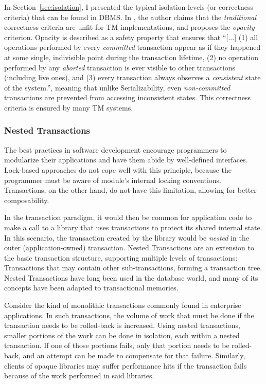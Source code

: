 \documentclass{llncs}
\begin{document}
In Section~\ref{sec:isolation}, I presented the typical isolation
levels (or correctness criteria) that can be found in DBMS. In
\cite{guerraoui2008correctness}, the author claims that the {\it
  traditional} correctness criteria are unfit for TM implementations,
and proposes the {\it opacity} criterion. Opacity is described as a
safety property that ensures that ``[...] (1) all operations performed
by every {\it committed} transaction appear as if they happened at
some single, indivisible point during the transaction lifetime, (2) no
operation performed by any {\it aborted} transaction is ever visible
to other transactions (including live ones), and (3) every transaction
always observes a {\it consistent} state of the system.'', meaning
that unlike Serializability, even {\it non-committed} transactions are
prevented from accessing inconsistent states. This correctness
criteria is ensured by many TM systems.

\subsubsection{Nested Transactions}

The best practices in software development encourage programmers to
modularize their applications and have them abide by well-defined
interfaces. Lock-based approaches do not cope well with this
principle, because the programmer must be aware of module's internal
locking conventions. Transactions, on the other hand, do not have this
limitation, allowing for better composability.

In the transaction paradigm, it would then be common for application
code to make a call to a library that uses transactions to protect its
shared internal state. In this scenario, the transaction created by
the library would be {\it nested} in the outer (application-owned)
transaction. Nested Transactions are an extension to the basic
transaction structure, supporting multiple levels of transactions:
Transactions that may contain other sub-transactions, forming a
transaction tree. Nested Transactions have long been used in the
database world, and many of its concepts have been adapted to
transactional memories.

Consider the kind of monolithic transactions commonly found in
enterprise applications. In such transactions, the volume of work that
must be done if the transaction needs to be rolled-back is
increased. Using nested transactions, smaller portions of the work can
be done in isolation, each within a nested transaction. If one of
those portions fails, only that portion needs to be rolled-back, and
an attempt can be made to compensate for that failure. Similarly,
clients of opaque libraries may suffer performance hits if the
transaction fails because of the work performed in said libraries.
\end{document}
